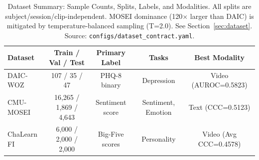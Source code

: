 \begin{table}[htbp]
\centering
\caption{Dataset Summary: Sample Counts, Splits, Labels, and Modalities. All splits are subject/session/clip-independent. MOSEI dominance (120$\times$ larger than DAIC) is mitigated by temperature-balanced sampling (T=2.0). See Section~\ref{sec:dataset}. Source: \texttt{configs/dataset\_contract.yaml}.}
\label{tab:dataset_summary}
\begin{tabular}{lcccc}
\toprule
Dataset & Train / Val / Test & Primary Label & Tasks & Best Modality \\
\midrule
DAIC-WOZ & 107 / 35 / 47 & PHQ-8 binary & Depression & Video (AUROC=0.5823) \\
CMU-MOSEI & 16,265 / 1,869 / 4,643 & Sentiment score & Sentiment, Emotion & Text (CCC=0.5123) \\
ChaLearn FI & 6,000 / 2,000 / 2,000 & Big-Five scores & Personality & Video (Avg CCC=0.4578) \\
\bottomrule
\end{tabular}
\end{table}